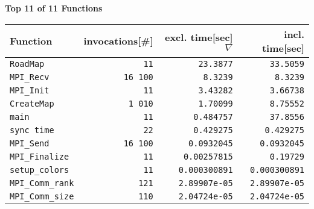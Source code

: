 \documentclass[a4paper,10pt]{article}
\begin{document}
\newpage

\begin{center}\small
{\Large \bf Top 11 of 11 Functions}
\bigskip
\begin{longtable}{|l||r|r|r|}

   \hline
   \bf Function & \bf invocations[\#] & \bf excl. time[sec] $\nabla$ & \bf incl. time[sec] \\
   \hline\hline
  \verb|RoadMap| &   \verb|11| &   \verb|23.3877| &   \verb|33.5059| \\
  \verb|MPI_Recv| &   \verb|16 100| &   \verb|8.3239| &   \verb|8.3239| \\
  \verb|MPI_Init| &   \verb|11| &   \verb|3.43282| &   \verb|3.66738| \\
      \hline
  \verb|CreateMap| &   \verb|1 010| &   \verb|1.70099| &   \verb|8.75552| \\
  \verb|main| &   \verb|11| &   \verb|0.484757| &   \verb|37.8556| \\
  \verb|sync time| &   \verb|22| &   \verb|0.429275| &   \verb|0.429275| \\
      \hline
  \verb|MPI_Send| &   \verb|16 100| &   \verb|0.0932045| &   \verb|0.0932045| \\
  \verb|MPI_Finalize| &   \verb|11| &   \verb|0.00257815| &   \verb|0.19729| \\
  \verb|setup_colors| &   \verb|11| &   \verb|0.000300891| &   \verb|0.000300891| \\
      \hline
  \verb|MPI_Comm_rank| &   \verb|121| &   \verb|2.89907e-05| &   \verb|2.89907e-05| \\
  \verb|MPI_Comm_size| &   \verb|110| &   \verb|2.04724e-05| &   \verb|2.04724e-05| \\
   \hline
\end{longtable}

\end{center}
\newpage
\end{document}
